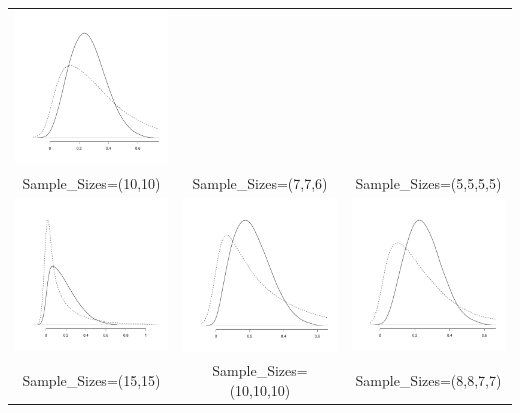 \begin{appendix}
\begin{longtable}{ccc}
		\includegraphics[width=4.05cm]{Sim_Kendall-Kruskal_5555_a.pdf} \\ 
		              Sample\_Sizes=(10,10) &   Sample\_Sizes=(7,7,6)  &    Sample\_Sizes=(5,5,5,5) \\  
\hline 
	\includegraphics[width=4.05cm]{Sim_Kendall-Kruskal_1515_b.pdf} & 
		\includegraphics[width=4.05cm]{Sim_Kendall-Kruskal_101010_a.pdf} & 
		\includegraphics[width=4.05cm]{Sim_Kendall-Kruskal_8877_a.pdf} \\ 
		              Sample\_Sizes=(15,15) &   Sample\_Sizes=(10,10,10) &    Sample\_Sizes=(8,8,7,7) \\  
		              \hline


\end{longtable}
\end{appendix}
